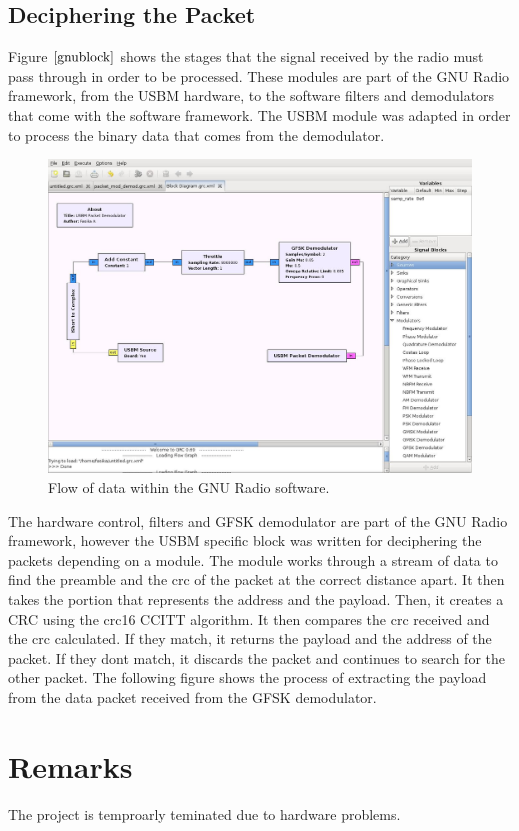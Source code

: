 \documentclass[a4paper,10pt]{article}
\begin{document}
\subsection{Deciphering the Packet}
Figure $\ref{gnublock}$ shows the stages that the signal received by the radio must
pass through in order to be processed. These modules are part of the
GNU Radio framework, from the USBM hardware, to the software filters
and demodulators that come with the software framework. The USBM
module was adapted in order to process the binary data that comes
from the demodulator. 
\begin{figure}
\centering
\includegraphics[width= 1\textwidth]{gnublock}
\caption{Flow of data within the GNU Radio software.}
\label{gnublock}
\label{dataflow}
\end{figure} 
The hardware control, filters and GFSK demodulator are
part of the GNU Radio framework, however the USBM specific block was
written for deciphering the packets depending on a module. The module works through a stream of data to
find the preamble and the crc of the packet at the correct distance
apart. It then takes the portion that represents the address and the
payload. Then, it creates a CRC using the crc16 CCITT algorithm. It
then compares the crc received and the crc calculated. If they
match, it returns the payload and the address of the packet. If they
dont match, it discards the packet and continues to search for the
other packet. The following figure shows the process of extracting
the payload from the data packet received from the GFSK demodulator.
\section{Remarks}
The project is temproarly teminated due to hardware problems.
\newpage
\appendix
\end{document}
